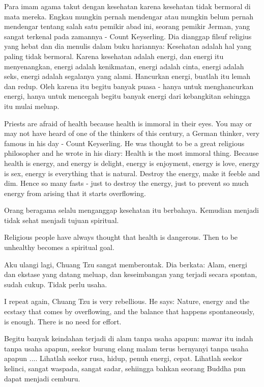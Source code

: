 \bahasa
Para imam agama takut dengan kesehatan karena kesehatan tidak bermoral di mata mereka. Engkau mungkin pernah mendengar atau mungkin belum pernah mendengar tentang salah satu pemikir abad ini, seorang pemikir Jerman, yang sangat terkenal pada zamannya - Count Keyserling. Dia dianggap filsuf religius yang hebat dan dia menulis dalam buku hariannya: Kesehatan adalah hal yang paling tidak bermoral. Karena kesehatan adalah energi, dan energi itu menyenangkan, energi adalah kenikmatan, energi adalah cinta, energi adalah seks, energi adalah segalanya yang alami. Hancurkan energi, buatlah itu lemah dan redup. Oleh karena itu begitu banyak puasa - hanya untuk menghancurkan energi, hanya untuk mencegah begitu banyak energi dari kebangkitan sehingga itu mulai meluap.

\english
Priests are afraid of health because health is immoral in their eyes. You may or may not have heard of one of the thinkers of this century, a German thinker, very famous in his day - Count Keyserling. He was thought to be a great religious philosopher and he wrote in his diary: Health is the most immoral thing. Because health is energy, and energy is delight, energy is enjoyment, energy is love, energy is sex, energy is everything that is natural. Destroy the energy, make it feeble and dim. Hence so many fasts - just to destroy the energy, just to prevent so much energy from arising that it starts overflowing.

\bahasa
Orang beragama selalu menganggap kesehatan itu berbahaya. Kemudian menjadi tidak sehat menjadi tujuan spiritual.

\english
Religious people have always thought that health is dangerous. Then to be unhealthy becomes a spiritual goal.

\bahasa
Aku ulangi lagi, Chuang Tzu sangat memberontak. Dia berkata: Alam, energi dan ekstase yang datang meluap, dan keseimbangan yang terjadi secara spontan, sudah cukup. Tidak perlu usaha.

\english
I repeat again, Chuang Tzu is very rebellious. He says: Nature, energy and the ecstasy that comes by overflowing, and the balance that happens spontaneously, is enough. There is no need for effort.

\bahasa
Begitu banyak keindahan terjadi di alam tanpa usaha apapun: mawar itu indah tanpa usaha apapun, seekor burung elang malam terus bernyanyi tanpa usaha apapun .... Lihatlah seekor rusa, hidup, penuh energi, cepat. Lihatlah seekor kelinci, sangat waspada, sangat sadar, sehiingga bahkan seorang Buddha pun dapat menjadi cemburu.

